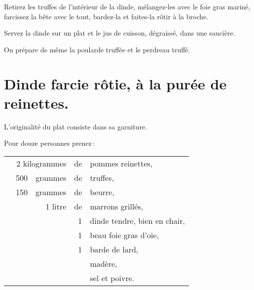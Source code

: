 Retirez les truffes de l'intérieur de la dinde, mélangez-les avec le foie gras
mariné, farcissez la bête avec le tout, bardez-la et faites-la rôtir à la
broche.

Servez la dinde sur un plat et le jus de cuisson, dégraissé, dans une saucière.

\sk

On prépare de même la poularde truffée et le perdreau truffé.

\section*{\centering Dinde farcie rôtie, à la purée de reinettes.}
{}

L'originalité du plat consiste dans sa garniture.

\smallskip

Pour douze personnes prenez :

\smallskip

\footnotesize
\begin{longtable}{rrrrp{18em}}
 &  \multicolumn{2}{r}{2 kilogrammes} & de & pommes reinettes,                                            \\
 &  500 & grammes & de & truffes,                                                                         \\
 &  150 & grammes & de & beurre,                                                                          \\
 &      & 1 litre & de & marrons grillés,                                                                 \\
 &      &         &  1 & dinde tendre, bien en chair,                                                     \\
 &      &         &  1 & beau foie gras d'oie,                                                            \\
 &      &         &  1 & barde de lard,                                                                   \\
 &      &         &    & madère,                                                                          \\
 &      &         &    & sel et poivre.                                                                   \\
\end{longtable}
\normalsize

